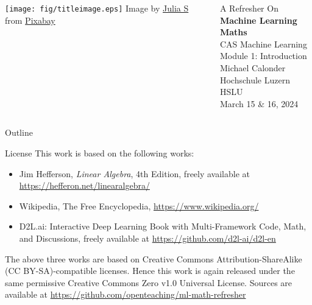 \documentclass[9pt,aspectratio=169,xcolor=dvipsnames]{beamer}
\begin{document}
\begin{frame}
    \begin{columns}[onlytextwidth]
        \begin{column}{0.4\textwidth}
            \vspace*{10mm}
            \texttt{[image: fig/titleimage.eps]}
            {\tiny Image by \href{https://pixabay.com/users/julia_s-4109630/}{Julia S} from
                \href{https://pixabay.com}{Pixabay}}
        \end{column}
        \begin{column}{0.6\textwidth}
            \flushright
            {A Refresher On}\\[1mm]
            {\Huge \textbf{Machine Learning Maths}}\\[15mm]
            {\Large CAS Machine Learning}\\[1mm]
            {\Large Module 1: Introduction}\\[15mm]
            Michael Calonder\\[1mm]
            Hochschule Luzern HSLU\\[1mm]
            {March 15 \& 16, 2024}\\
        \end{column}
    \end{columns}
\end{frame}

\begin{frame}{Outline}
    \tableofcontents
\end{frame}






% 
% 

\begin{frame}{License}
    \small
    This work is based on the following works:
    \begin{itemize}
        \item Jim Hefferson, \emph{Linear Algebra}, 4th Edition, freely available at \url{https://hefferon.net/linearalgebra/}
        \item Wikipedia, The Free Encyclopedia, \url{https://www.wikipedia.org/}
        \item D2L.ai: Interactive Deep Learning Book with Multi-Framework Code, Math, and Discussions, freely available at \url{https://github.com/d2l-ai/d2l-en}
    \end{itemize}

    The above three works are based on Creative Commons Attribution-ShareAlike (CC BY-SA)-compatible licenses. Hence this work is again released under
    the same permissive Creative Commons Zero v1.0 Universal License. Sources are available at \url{https://github.com/openteaching/ml-math-refresher}
\end{frame}
\end{document}

